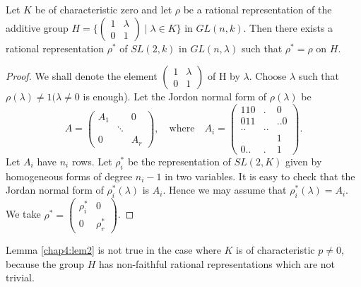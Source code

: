 \begin{lem}\label{chap4:lem2}%
  Let $K$ be of characteristic zero and let $\rho$ be a rational
  representation of the additive group $H = \bigg\{ \begin{pmatrix} 1
  & \lambda\\0 & 1 \end{pmatrix} \mid \lambda \in K \bigg\}$ in
  $GL(n, k)$. Then there exists a rational representation
  $\rho^*$ of $SL(2, k)$ in $GL(n,\lambda)$ such that
  $\rho^* = \rho$ on $H$. 
 \end{lem}

\begin{proof}
  We shall denote the element $\begin{pmatrix} 1 & \lambda \\ 0 &
    1 \end{pmatrix}$ of H by $\lambda$. Choose $\lambda$ such  
  that $\rho (\lambda)\ne 1 (\lambda \ne 0$ is enough). Let the
  Jordon normal form of $\rho(\lambda)$ be 
  $$
  A = \begin{pmatrix}
    A_1 & & 0\\ 
& \ddots & \\ 
0 & &  A_r
 \end{pmatrix}, \quad
  \text{where}\quad  A_i
  = \begin{pmatrix} 
    110 & . &    0\\
    011 & & .. 0 \\
    .. &..\\ 
    & &  1\\
    0.. & . & 1
 \end{pmatrix}.
  $$ 
  Let $A_i$ have $n_i$ rows. Let $ \rho_{i}^{*}$ be the
  representation of $SL(2, K)$ given by 
  homogeneous forms of degree $n_i -1$ in two variables. It is easy to
  check that the Jordan normal form of $\rho_{i}^{*}(\lambda)$
  is $A_i$. Hence we may assume that
  $\rho_{i}^{*}(\lambda)=A_i$. We take
  $\rho^{*}=\begin{pmatrix} \rho_{i}^{*} &    0\\
    0 & \rho_{r}^{*} \end{pmatrix}$. 
 \end{proof}
 
\setcounter{rem}{1}
\begin{rem}%
  Lemma  \ref{chap4:lem2} is not true in the case where $K$ is of
  characteristic  
  $p \ne 0$, because the group $H$ has non-faithful rational
  representations which are not trivial. 
\end{rem}

